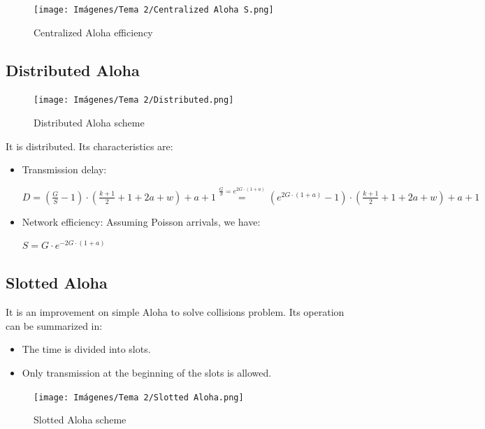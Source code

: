 \documentclass[
	12pt,
	twoside
]{book}
\begin{document}
\begin{figure}[H]
	\centering
	\texttt{[image: Imágenes/Tema 2/Centralized Aloha S.png]}
	\caption{
		\label{fig:unit2_cen_aloha_S}
		Centralized Aloha efficiency
	}
\end{figure}

\subsection{Distributed Aloha}

\begin{figure}[H]
	\centering
	\texttt{[image: Imágenes/Tema 2/Distributed.png]}
	\caption{
		\label{fig:unit2_dis_aloha_sheme}
		Distributed Aloha scheme
	}
\end{figure}

It is distributed. Its characteristics are:

\begin{itemize}
	\item {
		Transmission delay:

		$
			D =
			\left( \frac {G} {S} - 1 \right) \cdot \left( \frac {k+1} {2} + 1 + 2a + w \right) + a + 1 \overset{\frac {G} {S} = e^{2G \cdot (1+a)}}{=}
			\left( e^{2G \cdot (1+a)} - 1 \right) \cdot \left( \frac {k+1} {2} + 1 + 2a + w \right) + a + 1
		$
	}
	\item {
		Network efficiency: Assuming Poisson arrivals, we have:

		$
			S = G \cdot e^{-2G \cdot (1+a)}
		$
	}
\end{itemize}

\subsection{Slotted Aloha}

It is an improvement on simple Aloha to solve collisions problem. Its operation can be summarized in:

\begin{itemize}
	\item The time is divided into slots.
	\item Only transmission at the beginning of the slots is allowed.
\end{itemize}

\begin{figure}[H]
	\centering
	\texttt{[image: Imágenes/Tema 2/Slotted Aloha.png]}
	\caption{
		\label{fig:unit2_slo_aloha_sheme}
		Slotted Aloha scheme
	}
\end{figure}
\end{document}
